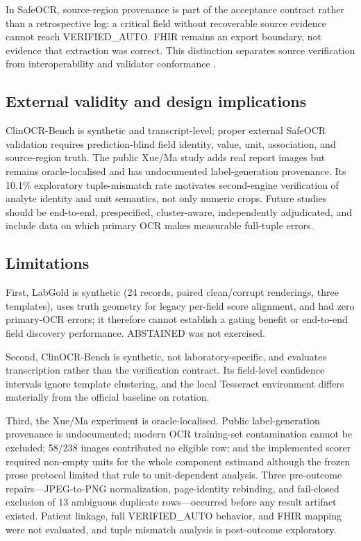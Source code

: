 \documentclass[10pt]{article}
\begin{document}
In SafeOCR, source-region provenance is part of the acceptance contract rather than a retrospective log: a critical field without recoverable source evidence cannot reach VERIFIED\_AUTO. FHIR remains an export boundary, not evidence that extraction was correct. This distinction separates source verification from interoperability and validator conformance \cite{daumke2019fhir,hl7fhirr4}.

\subsection{External validity and design implications}

ClinOCR-Bench is synthetic and transcript-level; proper external SafeOCR validation requires prediction-blind field identity, value, unit, association, and source-region truth. The public Xue/Ma study adds real report images but remains oracle-localised and has undocumented label-generation provenance. Its 10.1\% exploratory tuple-mismatch rate motivates second-engine verification of analyte identity and unit semantics, not only numeric crops. Future studies should be end-to-end, prespecified, cluster-aware, independently adjudicated, and include data on which primary OCR makes measurable full-tuple errors.

\subsection{Limitations}

First, LabGold is synthetic (24 records, paired clean/corrupt renderings, three templates), uses truth geometry for legacy per-field score alignment, and had zero primary-OCR errors; it therefore cannot establish a gating benefit or end-to-end field discovery performance. ABSTAINED was not exercised.

Second, ClinOCR-Bench is synthetic, not laboratory-specific, and evaluates transcription rather than the verification contract. Its field-level confidence intervals ignore template clustering, and the local Tesseract environment differs materially from the official baseline on rotation.

Third, the Xue/Ma experiment is oracle-localised. Public label-generation provenance is undocumented; modern OCR training-set contamination cannot be excluded; 58/238 images contributed no eligible row; and the implemented scorer required non-empty units for the whole component estimand although the frozen prose protocol limited that rule to unit-dependent analysis. Three pre-outcome repairs—JPEG-to-PNG normalization, page-identity rebinding, and fail-closed exclusion of 13 ambiguous duplicate rows—occurred before any result artifact existed. Patient linkage, full VERIFIED\_AUTO behavior, and FHIR mapping were not evaluated, and tuple mismatch analysis is post-outcome exploratory.
\end{document}
